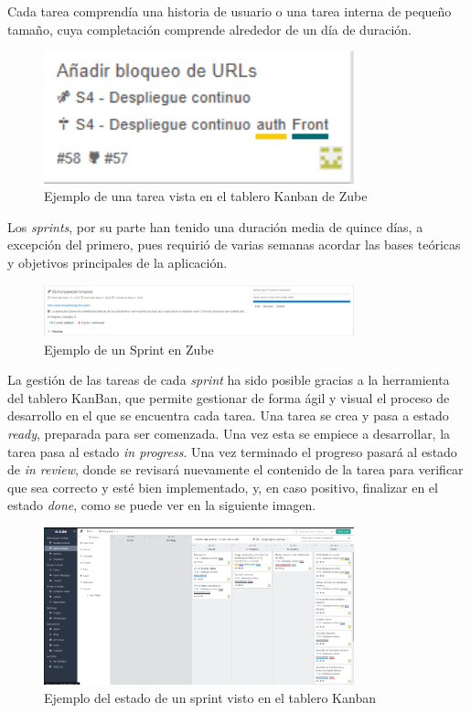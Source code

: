  Cada tarea comprendía una historia de usuario o una tarea interna de pequeño tamaño, cuya completación comprende alrededor de un día de duración. 

\begin{figure}[H]
\centering
\includegraphics[width=0.8\textwidth]{img/Tarea57.png}
\caption{Ejemplo de una tarea vista en el tablero Kanban de Zube}
\label{fig:Tarea57}
\end{figure}
 
 Los \textit{sprints}, por su parte han tenido una duración media de quince días, a excepción del primero, pues requirió de varias semanas acordar las bases teóricas y objetivos principales de la aplicación.

\begin{figure}[H]
\centering
\includegraphics[width=0.8\textwidth]{img/Sprint2.png}
\caption{Ejemplo de un Sprint en Zube}
\label{fig:Sprint2}
\end{figure}

La gestión de las tareas de cada \textit{sprint} ha sido posible gracias a la herramienta del tablero KanBan, que permite gestionar de forma ágil y visual el proceso de desarrollo en el que se encuentra cada tarea. Una tarea se crea y pasa a estado \textit{ready}, preparada para ser comenzada. Una vez esta se empiece a desarrollar, la tarea pasa al estado \textit{in progress}. Una vez terminado el progreso pasará al estado de \textit{in review}, donde se revisará nuevamente el contenido de la tarea para verificar que sea correcto y esté bien implementado, y, en caso positivo, finalizar en el estado \textit{done}, como se puede ver en la siguiente imagen.

\begin{figure}[H]
\centering
\includegraphics[width=0.8\textwidth]{img/IteracionZube.png}
\caption{Ejemplo del estado de un sprint visto en el tablero Kanban}
\label{fig:Zube}
\end{figure}

